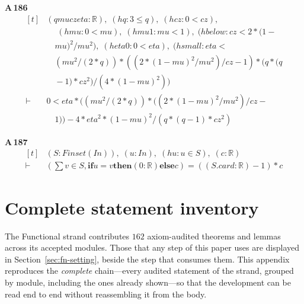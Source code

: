 \noindent\textbf{A\,186}\quad{}
{\footnotesize\[ \begin{aligned}[t]
&(\mathit{q} \mathit{mu} \mathit{cz} \mathit{eta} : \mathbb{R} ),\; (\mathit{hq} : 3 \leq \mathit{q}),\; (\mathit{hcz} : 0 < \mathit{cz}),\\
&\quad \; (\mathit{hmu} : 0 < \mathit{mu}),\; (\mathit{hmu1} : \mathit{mu} < 1),\; (\mathit{hbelow} : \mathit{cz} < 2*(1-\\
&\quad \mathit{mu})^{2}/\mathit{mu}^{2}),\; (\mathit{heta0} : 0 < \mathit{eta}),\; (\mathit{hsmall} : \mathit{eta} <\\
&\quad (\mathit{mu}^{2}/(2*\mathit{q}))*((2*(1-\mathit{mu})^{2}/\mathit{mu}^{2})/\mathit{cz}-1)*(\mathit{q}*(\mathit{q}\\
&\quad -1)*\mathit{cz}^{2})/(4*(1-\mathit{mu})^{2}))\\
\vdash\;&0 < \mathit{eta}*((\mathit{mu}^{2}/(2*\mathit{q}))*((2*(1-\mathit{mu})^{2}/\mathit{mu}^{2})/\mathit{cz}-\\
&\quad 1))-4*\mathit{eta}^{2}*(1-\mathit{mu})^{2}/(\mathit{q}*(\mathit{q}-1)*\mathit{cz}^{2})
\end{aligned} \]}

\noindent\textbf{A\,187}\quad{}
{\footnotesize\[ \begin{aligned}[t]
&(\mathit{S} : \mathit{Finset} (\mathit{I} \mathit{n})),\; (\mathit{u} : \mathit{I} \mathit{n}),\; (\mathit{hu} : \mathit{u} \in \mathit{S}),\; (\mathit{c} : \mathbb{R} )\\
\vdash\;&(\textstyle\sum \mathit{v} \in \mathit{S}, \mathbf{if} \mathit{u} = \mathit{v} \mathbf{then} (0:\mathbb{R} ) \mathbf{else} \mathit{c}) = ((\mathit{S}.\mathit{card} : \mathbb{R} )-1)*\mathit{c}
\end{aligned} \]}

\section{Complete statement inventory}
\label{app:fn-inventory}

The Functional strand contributes $162$ axiom-audited theorems and lemmas across its accepted modules. Those that any step of this paper uses are displayed in Section~\ref{sec:fn-setting}, beside the step that consumes them. This appendix reproduces the \emph{complete} chain---every audited statement of the strand, grouped by module, including the ones already shown---so that the development can be read end to end without reassembling it from the body.

